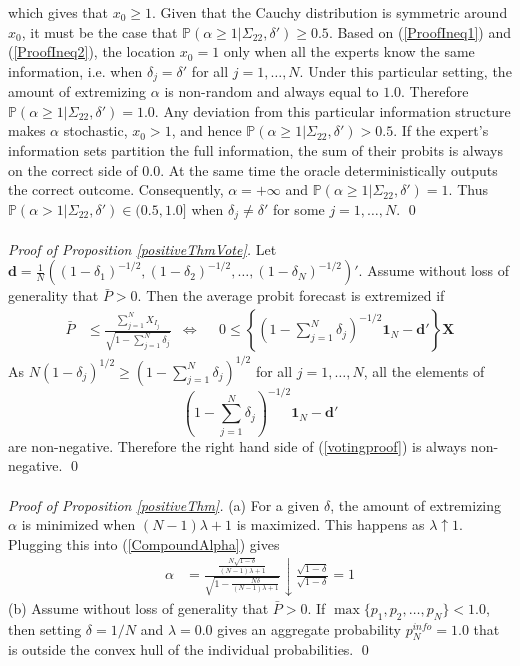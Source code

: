 \documentclass[11pt]{article}
\renewcommand{\P}{\mathbb{P}}
\theoremstyle{definition}
\theoremstyle{definition}
\begin{document}
which gives that $x_0 \geq 1$. Given that the Cauchy distribution is symmetric around $x_0$, it must be the case that $\P(\alpha \geq 1 | \Sigma_{22}, \delta') \geq 0.5$. Based on (\ref{ProofIneq1}) and (\ref{ProofIneq2}), the location $x_0 = 1$ only when all the experts know the same information, i.e. when $\delta_j = \delta'$ for all $j = 1, \dots, N$. Under this particular setting, the amount of extremizing $\alpha$ is non-random and always equal to $1.0$. Therefore $\P(\alpha \geq 1 | \Sigma_{22}, \delta') = 1.0$.  Any deviation from this particular information structure makes $\alpha$ stochastic, $x_0 > 1$, and hence $\P(\alpha \geq 1 | \Sigma_{22}, \delta') > 0.5$. If the expert's information sets partition the full information, the sum of their probits is always on the correct side of $0.0$. At the same time the oracle deterministically outputs the correct outcome. Consequently, $\alpha = +\infty$ and $\P(\alpha \geq 1 | \Sigma_{22}, \delta') = 1$. Thus $\P(\alpha > 1 | \Sigma_{22}, \delta') \in (0.5, 1.0]$ when $\delta_j \neq \delta'$ for some $j = 1, \dots, N$. \qed
\\
\\
\noindent
\textit{Proof of Proposition \ref{positiveThmVote}.} Let $\boldsymbol{d} = \frac{1}{N}\left((1-\delta_1)^{-1/2}, (1-\delta_2)^{-1/2}, \dots, (1-\delta_N)^{-1/2}\right)'$. Assume without loss of generality that $\bar{P} > 0$. Then the average probit forecast is extremized if
\begin{align}
 \bar{P}&\leq  \frac{\sum_{j=1}^N X_{I_j}}{\sqrt{1 - \sum_{j=1}^N \delta_j}} &\Leftrightarrow&& 0 \leq  \left\{  \left(1 - \sum_{j=1}^N \delta_j \right)^{-1/2} \boldsymbol{1}_N - \boldsymbol{d}' \right\} \boldsymbol{X} \label{votingproof}
\end{align}
 As $N (1-\delta_j)^{1/2} \geq \left(1 - \sum_{j=1}^N \delta_j \right)^{1/2}$ for all $j = 1, \dots, N$, all the elements of $$\left(1 - \sum_{j=1}^N \delta_j \right)^{-1/2} \boldsymbol{1}_N - \boldsymbol{d}' $$ are non-negative. Therefore the right hand side of (\ref{votingproof}) is always non-negative. \qed
\\
\\
\noindent
\textit{Proof of Proposition \ref{positiveThm}.} (a) For a given $\delta$, the amount of extremizing $\alpha$ is minimized when $(N-1)\lambda +1$ is maximized. This happens as $\lambda \uparrow 1$. Plugging this into (\ref{CompoundAlpha}) gives
\begin{align*}
\alpha &= \frac{\frac{N\sqrt{1-\delta}}{(N-1)\lambda +1}}{\sqrt{1- \frac{N\delta}{(N-1)\lambda +1} }}  \downarrow \frac{\sqrt{1-\delta}}{\sqrt{1-\delta }} = 1
\end{align*}
(b) Assume without loss of generality that $\bar{P} > 0$. If $\max\{p_1, p_2, \dots, p_N \} < 1.0$, then  setting $\delta = 1/N$ and $\lambda = 0.0$ gives an aggregate probability $p_N^{info} = 1.0$ that is outside the convex hull of the individual probabilities.
\qed
\end{document}
